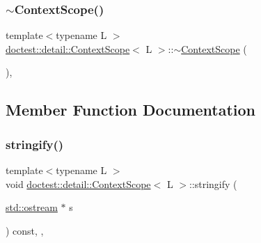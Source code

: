 \mbox{\label{classdoctest_1_1detail_1_1ContextScope_a1ee7d4702398ee8d0e80ab843aa260d7}} 
\subsubsection{\texorpdfstring{$\sim$\+Context\+Scope()}{~ContextScope()}}
{\footnotesize\ttfamily template$<$typename L $>$ \\
\hyperlink{classdoctest_1_1detail_1_1ContextScope}{doctest\+::detail\+::\+Context\+Scope}$<$ L $>$\+::$\sim$\hyperlink{classdoctest_1_1detail_1_1ContextScope}{Context\+Scope} (\begin{DoxyParamCaption}{ }\end{DoxyParamCaption})\hspace{0.3cm}{\ttfamily [inline]}, {\ttfamily [override]}}



\subsection{Member Function Documentation}
\mbox{\label{classdoctest_1_1detail_1_1ContextScope_a4636ac32ae41ae108c7ada4a164ffaeb}} 
\subsubsection{\texorpdfstring{stringify()}{stringify()}}
{\footnotesize\ttfamily template$<$typename L $>$ \\
void \hyperlink{classdoctest_1_1detail_1_1ContextScope}{doctest\+::detail\+::\+Context\+Scope}$<$ L $>$\+::stringify (\begin{DoxyParamCaption}\item[{\hyperlink{doctest_8h_a116af65cb5e924b33ad9d9ecd7a783f3}{std\+::ostream} $\ast$}]{s }\end{DoxyParamCaption}) const\hspace{0.3cm}{\ttfamily [inline]}, {\ttfamily [override]}, {\ttfamily [virtual]}}



